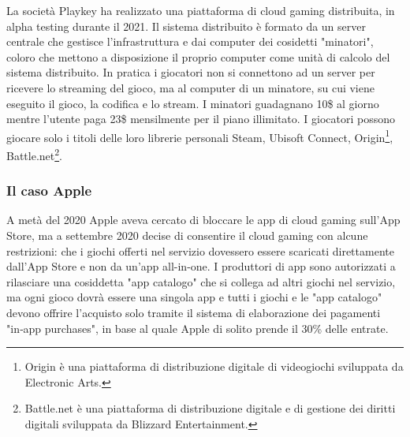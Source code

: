 La società Playkey ha realizzato una piattaforma di cloud gaming distribuita, in alpha testing durante il 2021. Il sistema distribuito è formato da un server centrale che gestisce l'infrastruttura e dai computer dei cosidetti "minatori", coloro che mettono a disposizione il proprio computer come unità di calcolo del sistema distribuito. In pratica i giocatori non si connettono ad un server per ricevere lo streaming del gioco, ma al computer di un minatore, su cui viene eseguito il gioco, la codifica e lo stream. I minatori guadagnano 10\$ al giorno mentre l'utente paga 23\$ mensilmente per il piano illimitato. I giocatori possono giocare solo i titoli delle loro librerie personali Steam, Ubisoft Connect, Origin\footnote{Origin è una piattaforma di distribuzione digitale di videogiochi sviluppata da Electronic Arts.}, Battle.net\footnote{Battle.net è una piattaforma di distribuzione digitale e di gestione dei diritti digitali sviluppata da Blizzard Entertainment.}\cite{Playkey}.

\subsubsection{Il caso Apple}
A metà del 2020 Apple aveva cercato di bloccare le app di cloud gaming sull'App Store, ma a settembre 2020 decise di consentire il cloud gaming con alcune restrizioni: che i giochi offerti nel servizio dovessero essere scaricati direttamente dall'App Store e non da un'app all-in-one. I produttori di app sono autorizzati a rilasciare una cosiddetta "app catalogo" che si collega ad altri giochi nel servizio, ma ogni gioco dovrà essere una singola app e tutti i giochi e le "app catalogo" devono offrire l'acquisto solo tramite il sistema di elaborazione dei pagamenti "in‑app purchases", in base al quale Apple di solito prende il 30\% delle entrate\cite{Apple_controversy}.